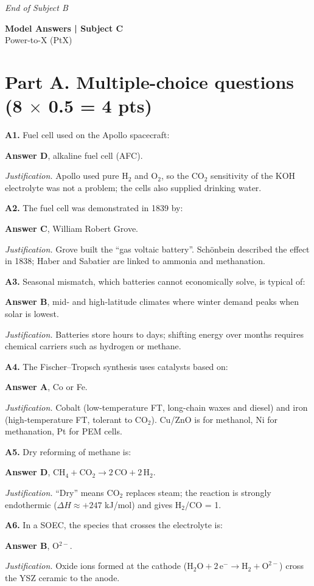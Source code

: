 \documentclass[11pt,a4paper]{article}
\newcommand{\q}[2]{\par\medskip\textbf{#1.} #2\par}
\newcommand{\answer}[2]{\textcolor{ans}{\textbf{Answer #1}}, #2\par}
\newcommand{\why}[1]{\textit{Justification.} #1\par}
\newcommand{\pts}[1]{\hfill{\normalsize\textbf{(#1)}}}
\begin{document}
\begin{center}\textit{End of Subject B}\end{center}

\clearpage
\begin{center}
{\LARGE\bfseries Model Answers | Subject C}\\[3pt]
{\large Power-to-X (PtX)}
\end{center}

\section{Part A. Multiple-choice questions \pts{8 $\times$ 0.5 = 4 pts}}

\q{A1}{Fuel cell used on the Apollo spacecraft:}
\answer{D}{alkaline fuel cell (AFC).}
\why{Apollo used pure H$_2$ and O$_2$, so the CO$_2$ sensitivity of the KOH electrolyte was not a problem; the cells
also supplied drinking water.}

\q{A2}{The fuel cell was demonstrated in 1839 by:}
\answer{C}{William Robert Grove.}
\why{Grove built the ``gas voltaic battery''. Schönbein described the effect in 1838; Haber and Sabatier are linked to
ammonia and methanation.}

\q{A3}{Seasonal mismatch, which batteries cannot economically solve, is typical of:}
\answer{B}{mid- and high-latitude climates where winter demand peaks when solar is lowest.}
\why{Batteries store hours to days; shifting energy over months requires chemical carriers such as hydrogen or
methane.}

\q{A4}{The Fischer--Tropsch synthesis uses catalysts based on:}
\answer{A}{Co or Fe.}
\why{Cobalt (low-temperature FT, long-chain waxes and diesel) and iron (high-temperature FT, tolerant to CO$_2$).
Cu/ZnO is for methanol, Ni for methanation, Pt for PEM cells.}

\q{A5}{Dry reforming of methane is:}
\answer{D}{$\mathrm{CH_4 + CO_2 \longrightarrow 2\,CO + 2\,H_2}$.}
\why{``Dry'' means CO$_2$ replaces steam; the reaction is strongly endothermic ($\Delta H \approx +247$ kJ/mol) and
gives H$_2$/CO = 1.}

\q{A6}{In a SOEC, the species that crosses the electrolyte is:}
\answer{B}{O$^{2-}$.}
\why{Oxide ions formed at the cathode ($\mathrm{H_2O + 2\,e^- \rightarrow H_2 + O^{2-}}$) cross the YSZ ceramic to the
anode.}
\end{document}

